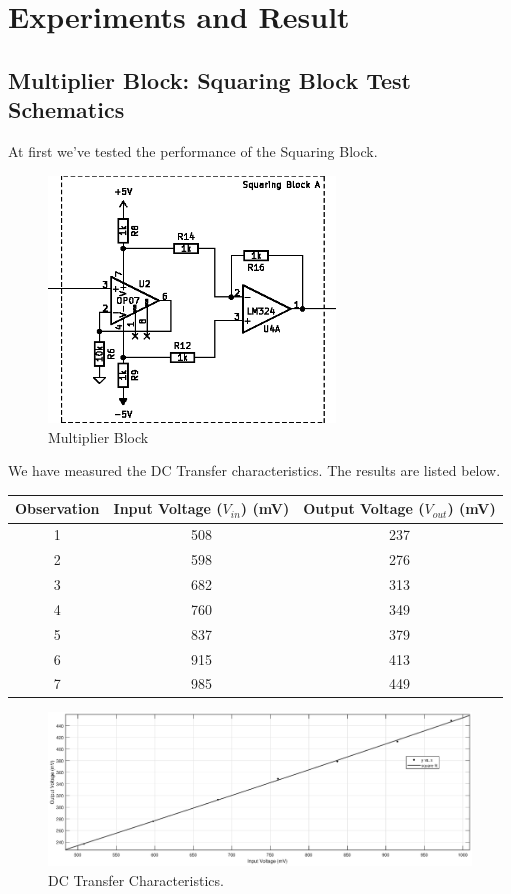 \chapter{Experiments and Result}
\section{Multiplier Block: Squaring Block Test Schematics}
At first we've tested the performance of the Squaring Block.

\begin{figure}[h]
	\centering
	\includegraphics[width=3in]{fig/ckt6.eps}
	\caption{Multiplier Block}
	\label{ckt5}
\end{figure}

We have measured the DC Transfer characteristics. The results are listed below.

\vspace{1cm}
\begin{tabular}{c c c}
	Observation & Input Voltage ($ V_{in} $) (mV) & Output Voltage ($ V_{out} $) (mV)\\
	\hline
	1	&	508 &	237\\
	2	&	598	&	276\\
	3	&	682	&	313\\
	4	&	760	&	349\\
	5	& 	837	&	379\\
	6	&	915	&	413\\
	7	&	985	&	449
\end{tabular}
\begin{figure}[h]
	\centering
	\includegraphics[width=\columnwidth]{fig/plt1.eps}
	\caption{DC Transfer Characteristics.}
	\label{plt1}
\end{figure}

